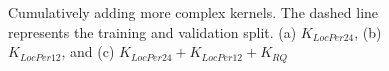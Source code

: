 \begin{figure}[H]
    \centering
    \graphicspath{ {./images/} }
     \\
    \\
    \caption{Cumulatively adding more complex kernels. The dashed line represents the training and validation split. (a) $K_{LocPer24}$, (b) $K_{LocPer12}$, and (c) $K_{LocPer24} + K_{LocPer12} + K_{RQ}$}  \label{fig:AB}
    \label{fig:fig13}
\end{figure}

